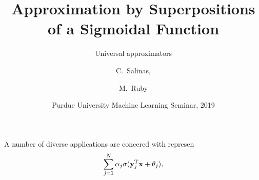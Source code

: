 \documentclass[12pt,letterpape]{beamer}
\title[Approximation by a Sigmoidal Function] 
{Approximation by Superpositions of a Sigmoidal Function}
\subtitle{Universal approximators}
\author[C.\ Salinas, M.\ Ruby] 
{C.\ Salinas,%
  \and M.\ Ruby%
}
\institute[Purdue University] %
{
  Department of Mathematics\\
  Purdue University
 }
\date[Spring 2019] %
{Purdue University Machine Learning Seminar, 2019}
\begin{document}
\frame{\titlepage}

\begin{frame}
  A number of diverse applications are concered with represen
  \[
    \sum_{j=1}^N\alpha_j\sigma(\mathbf{y}_j^{\mathrm{T}}\mathbf{x}+\theta_j),
  \]
\end{frame}
\end{document}
